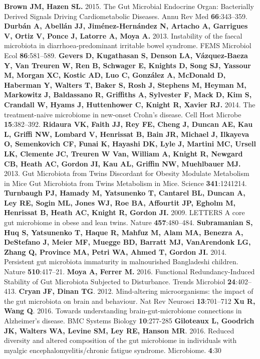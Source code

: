\documentclass[12pt,oneside,letterpaper]{article}
\begin{document}
\begin{thebibliography}{99}
 {\bf Brown JM, Hazen SL.} 2015. The Gut Microbial Endocrine Organ: Bacterially Derived Signals Driving Cardiometabolic Diseases. Annu Rev Med {\bf 66}:343–359.
 {\bf Durbán A, Abellán JJ, Jiménez-Hernández N, Artacho A, Garrigues V, Ortiz V, Ponce J, Latorre A, Moya A.} 2013. Instability of the faecal microbiota in diarrhoea-predominant irritable bowel syndrome. FEMS Microbiol Ecol {\bf 86}:581–589.
 {\bf Gevers D, Kugathasan S, Denson LA, Vázquez-Baeza Y, Van Treuren W, Ren B, Schwager E, Knights D, Song SJ, Yassour M, Morgan XC, Kostic AD, Luo C, González A, McDonald D, Haberman Y, Walters T, Baker S, Rosh J, Stephens M, Heyman M, Markowitz J, Baldassano R, Griffiths A, Sylvester F, Mack D, Kim S, Crandall W, Hyams J, Huttenhower C, Knight R, Xavier RJ.} 2014. The treatment-naive microbiome in new-onset Crohn’s disease. Cell Host Microbe {\bf 15}:382–392.
 {\bf Ridaura VK, Faith JJ, Rey FE, Cheng J, Duncan AE, Kau L, Griffi NW, Lombard V, Henrissat B, Bain JR, Michael J, Ilkayeva O, Semenkovich CF, Funai K, Hayashi DK, Lyle J, Martini MC, Ursell LK, Clemente JC, Treuren W Van, William A, Knight R, Newgard CB, Heath AC, Gordon JI, Kau AL, Griffin NW, Muehlbauer MJ.} 2013. Gut Microbiota from Twins Discordant for Obesity Modulate Metabolism in Mice Gut Microbiota from Twins Metabolism in Mice. Science {\bf 341}:1241214.
 {\bf Turnbaugh PJ, Hamady M, Yatsunenko T, Cantarel BL, Duncan A, Ley RE, Sogin ML, Jones WJ, Roe BA, Affourtit JP, Egholm M, Henrissat B, Heath AC, Knight R, Gordon JI.} 2009. LETTERS A core gut microbiome in obese and lean twins. Nature {\bf 457}:480–484.
 {\bf Subramanian S, Huq S, Yatsunenko T, Haque R, Mahfuz M, Alam MA, Benezra A, DeStefano J, Meier MF, Muegge BD, Barratt MJ, VanArendonk LG, Zhang Q, Province MA, Petri WA, Ahmed T, Gordon JI.} 2014. Persistent gut microbiota immaturity in malnourished Bangladeshi children. Nature {\bf 510}:417–21.
 {\bf Moya A, Ferrer M.} 2016. Functional Redundancy-Induced Stability of Gut Microbiota Subjected to Disturbance. Trends Microbiol {\bf 24}:402–413.
 {\bf Cryan JF, Dinan TG}. 2012. Mind-altering microorganisms: the impact of the gut microbiota on brain and behaviour. Nat Rev Neurosci {\bf 13}:701–712
 {\bf Xu R, Wang Q}. 2016. Towards understanding brain-gut-microbiome connections in Alzheimer's disease. BMC Systems Biology {\bf 10}:277-285
 {\bf Giloteaux L, Goodrich JK, Walters WA, Levine SM, Ley RE, Hanson MR}. 2016.
Reduced diversity and altered composition of the gut microbiome in individuals with myalgic encephalomyelitis/chronic fatigue syndrome. Microbiome. {\bf 4}:30

\end{thebibliography}
\end{document}
